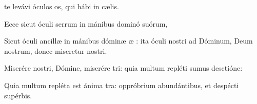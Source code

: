 \item {} te levávi óculos os,\psstar{} qui hábi in cælis.

\item Ecce sicut óculi serrum\psstar{} in mánibus dominó suórum,

\item Sicut óculi ancíllæ in mánibus dóminæ æ :\psstar{} ita óculi nostri ad Dóminum, Deum nostrum, donec miseretur nostri.

\item Miserére nostri, Dómine, miserére tri:\psstar{} quia multum repléti sumus desctióne:

\item Quia multum repléta est ánima tra:\psstar{} oppróbrium abundántibus, et despécti supérbis.
